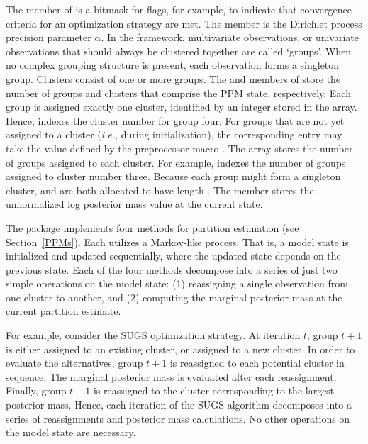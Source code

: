 \documentclass[article, nojss]{jss}
\begin{document}
The  member of  is a bitmask for flags, for example, to indicate that convergence criteria for an optimization strategy are met. The  member is the Dirichlet process precision parameter $\alpha$. In the  framework, multivariate observations, or univariate observations that should always be clustered together are called `groups'. When no complex grouping structure is present, each observation forms a singleton group. Clusters consist of one or more groups. The  and  members of  store the number of groups and clusters that comprise the PPM state, respectively. Each group is assigned exactly one cluster, identified by an integer stored in the  array. Hence,  indexes the cluster number for group four. For groups that are not yet assigned to a cluster ({\it i.e.}, during initialization), the corresponding  entry may take the value defined by the  preprocessor macro . The  array stores the number of groups assigned to each cluster. For example,  indexes the number of groups assigned to cluster number three. Because each group might form a singleton cluster,  and  are both allocated to have length . The  member stores the unnormalized log posterior mass value at the current state.

The  package implements four methods for partition estimation (see Section~\ref{PPMs}). Each utilizes a Markov-like process. That is, a model state is initialized and updated sequentially, where the updated state depends on the previous state. Each of the four methods decompose into a series of just two simple operations on the model state: (1) reassigning a single observation from one cluster to another, and (2) computing the marginal posterior mass at the current partition estimate.

For example, consider the SUGS optimization strategy. At iteration $t$, group $t+1$ is either assigned to an existing cluster, or assigned to a new cluster. In order to evaluate the alternatives, group $t+1$ is reassigned to each potential cluster in sequence. The marginal posterior mass is evaluated after each reassignment. Finally, group $t+1$ is reassigned to the cluster corresponding to the largest posterior mass. Hence, each iteration of the SUGS algorithm decomposes into a series of reassignments and posterior mass calculations. No other operations on the model state are necessary. 
 
\end{document}
